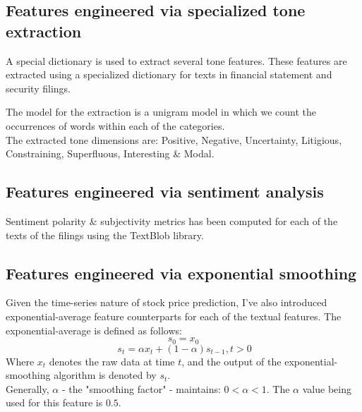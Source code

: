 \documentclass[11pt,a4paper]{article}
\begin{document}
\subsection{Features engineered via specialized tone extraction}
A special dictionary is used to extract several tone features. These features are extracted using a specialized dictionary for texts in financial statement and security filings.

The model for the extraction is a unigram model in which we count the occurrences of words within each of the categories. \\
The extracted tone dimensions are: Positive, Negative, Uncertainty, Litigious, Constraining, Superfluous, Interesting \& Modal.


\subsection{Features engineered via sentiment analysis}
Sentiment polarity \& subjectivity metrics has been computed for each of the texts of the filings using the TextBlob library.

\subsection{Features engineered via exponential smoothing}
Given the time-series nature of stock price prediction, I've also introduced exponential-average feature counterparts for each of the textual features.
The exponential-average is defined as follows:
\[ s_0 = x_0 \]
\[\ s_t = \alpha x_t + (1-\alpha)s_{t-1} , t > 0\]
Where $ x_t $ denotes the raw data at time $t$, and the output of the exponential-smoothing algorithm is denoted by $ s_t $. \\
Generally, $\alpha$ - the "smoothing factor" - maintains: $0 < \alpha < 1$. The $\alpha$ value being used for this feature is $0.5$.
  
\end{document}
